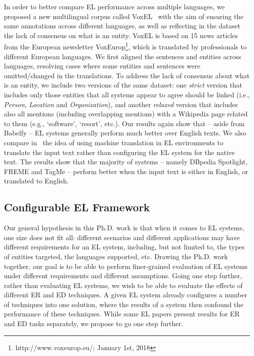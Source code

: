 \documentclass[sigconf]{acmart}
\begin{document}
In order to better compare EL performance across multiple languages, we proposed a new multilingual corpus called VoxEL~\cite{VoxEL2018} with the aim of ensuring the same annotations across different languages, as well as reflecting in the dataset the lack of consensus on what is an entity. VoxEL is based on 15 news articles from the European newsletter VoxEurop\footnote{http://www.voxeurop.eu/; January 1st, 2018}, which is translated by professionals to different European languages. We first aligned the sentences and entities across languages, resolving cases where some entities and sentences were omitted/changed in the translations. To address the lack of consensus about what is an entity, we include two versions of the same dataset: one \textit{strict} version that includes only those entities that all systems appear to agree should be linked (i.e., \textit{Person}, \textit{Location} and \textit{Organization}), and another \textit{relaxed} version that includes also all mentions (including overlapping mentions) with a Wikipedia page related to them (e.g., `software',  `resort', etc.). Our results again show that -- aside from Babelfy -- EL systems generally perform much better over English texts. We also compare in~\cite{Rosales-MendezH18a} the idea of using machine translation in EL environments to translate the input text rather than configuring the EL system for the native text. The results show that the majority of systems -- namely DBpedia Spotlight, FREME and TagMe -- perform better when the input text is either in English, or translated to English. %


\subsection{Configurable EL Framework}

Our general hypothesis in this Ph.D. work is that when it comes to EL systems, one size does not fit all: different scenarios and different applications may have different requirements for an EL system, including, but not limited to, the types of entities targeted, the languages supported, etc. Drawing the Ph.D. work together, our goal is to be able to perform finer-grained evaluation of EL systems under different requirements and different assumptions. Going one step further, rather than evaluating EL systems, we wish to be able to evaluate the effects of different ER and ED techniques. A given EL system already configures a number of techniques into one solution, where the results of a system then confound the performance of these techniques. While some EL papers present results for ER and ED tasks separately, we propose to go one step further.
\end{document}
